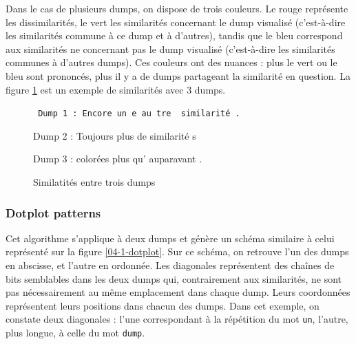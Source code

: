 Dans le cas de plusieurs dumps, on dispose de trois couleurs. Le rouge représente les dissimilarités, le vert les similarités concernant le dump visualisé (c'est-à-dire les similarités commune à ce dump et à d'autres), tandis que le bleu correspond aux similarités ne concernant pas le dump visualisé (c'est-à-dire les similarités communes à d'autres dumps).
Ces couleurs ont des nuances : plus le vert ou le bleu sont prononcés, plus il y a de dumps partageant la similarité en question. La figure \ref{04-1-sim_mult} est un exemple de similarités avec 3 dumps.

\begin{figure}[!h]
  \begin{center}
\small{
  {\tt
  {Dump 1 : \color{dissimColor} Encore un}{\color{otherSimColor} e au}{\color{dissimColor} tre }{\color{simColor} similarité}{\color{dissimColor} .}

  {Dump 2 : \color{dissimColor} Toujours }{\color{simColor} plus }{\color{dissimColor} de }{\color{simColor} similarité}{\color{dissimColor} s}

  {Dump 3 : \color{dissimColor} colorées }{\color{simColor} plus }{\color{dissimColor} qu'}{\color{otherSimColor} auparavant}{\color{dissimColor} .}
  }}
  \end{center}
  \caption{Similatités entre trois dumps}
  \label{04-1-sim_mult}
\end{figure}

\subsubsection{Dotplot patterns \cite {ref-dotplot}} \label{04-dotplot}

Cet algorithme s'applique à deux dumps et génère un schéma similaire à celui représenté sur la figure \ref{04-1-dotplot}.
Sur ce schéma, on retrouve l'un des dumps en abscisse, et l'autre en ordonnée. Les diagonales représentent des chaînes de bits semblables dans les deux dumps qui, contrairement aux similarités, ne sont pas nécessairement au même emplacement dans chaque dump. Leurs coordonnées représentent leurs positions dans chacun des dumps.
Dans cet exemple, on constate deux diagonales : l'une correspondant à la répétition du mot \texttt{un}, l'autre, plus longue, à celle du mot \texttt{dump}.


